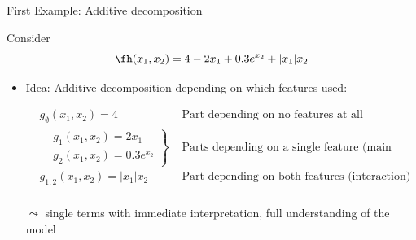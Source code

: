 \documentclass[11pt,compress,t,notes=noshow, aspectratio=169, xcolor=table]{beamer}
\begin{document}
\begin{frame}{First Example: Additive decomposition}

    \begin{example}

    Consider
    $$
    \fh(x_1, x_2) = 4 - 2x_1 + 0.3 e^{x_2} + |x_1|x_2
    $$

    \begin{itemize}
    
        \item Idea: Additive decomposition depending on which features used:
        
        \pause
        \begin{equation}\label{eq:func_decomp_first_min_example}
        \begin{aligned}
            & g_\emptyset(x_1, x_2) = 4 & \text{ Part depending on no features at all (intercept)}  \\
            &
            \left.\begin{aligned}
                & g_1(x_1, x_2) = 2x_1 \\
                & g_2(x_1, x_2) = 0.3 e^{x_2}
            \end{aligned}\right\}
                & \text{ Parts depending on a single feature (main effects)}  \\
            & g_{1,2}(x_1, x_2) = |x_1|x_2 & \text{ Part depending on both features (interaction)}  \\
        \end{aligned}
        \end{equation}
        \item[$\leadsto$] single terms with immediate interpretation, full understanding of the model


\end{itemize}
\end{example}
\end{frame}
\end{document}
